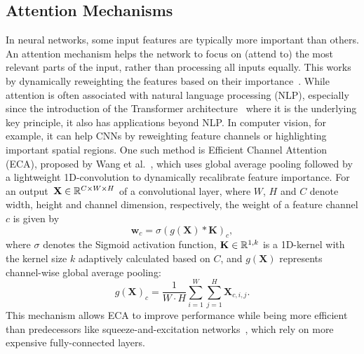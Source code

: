 \subsection{Attention Mechanisms}

In neural networks, some input features are typically more important than others.
An attention mechanism helps the network to focus on (attend to) the most relevant parts of the input, rather than processing all inputs equally.
This works by dynamically reweighting the features based on their importance~\cite{Attention}.
While attention is often associated with natural language processing (NLP), especially since the introduction of the Transformer architecture~\cite{Transformer} where it is the underlying key principle, it also has applications beyond NLP.\@
In computer vision, for example, it can help CNNs by reweighting feature channels or highlighting important spatial regions.
One such method is Efficient Channel Attention (ECA), proposed by Wang et al.~\cite{ECA}, which uses global average pooling followed by a lightweight 1D-convolution to dynamically recalibrate feature importance.
For an output~$\mathbf{X} \in \mathbb{R}^{C \times W \times H}$ of a convolutional layer, where $W$, $H$ and $C$ denote width, height and channel dimension, respectively, the weight of a feature channel $c$ is given by
\begin{equation}
    \mathbf{w}_c = \sigma(g(\mathbf{X}) \ast \mathbf{K})_c,
\end{equation}
where $\sigma$ denotes the Sigmoid activation function, $\mathbf{K} \in \mathbb{R}^{1,k}$ is a 1D-kernel with the kernel size $k$ adaptively calculated based on $C$, and $g(\mathbf{X})$ represents channel-wise global average pooling:
\begin{equation}
    g(\mathbf{X})_c = \frac{1}{W \cdot H} \sum_{i=1}^{W} \sum_{j=1}^{H} \mathbf{X}_{c,i,j}.
\end{equation}
This mechanism allows ECA to improve performance while being more efficient than predecessors like squeeze-and-excitation networks~\cite{SqueezeExcite}, which rely on more expensive fully-connected layers.
